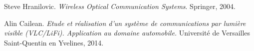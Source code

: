 \documentclass[12pt]{report}
\begin{document}
\begin{thebibliography}{9}

Steve Hranilovic.
\textit{Wireless Optical Communication Systems}.
Springer, 2004.

Alin Cailean.
\textit{Etude et réalisation d’un système de communications par lumière visible (VLC/LiFi). Application au domaine automobile.}
Université de Versailles Saint-Quentin en Yvelines, 2014.

\end{thebibliography}
\end{document}
